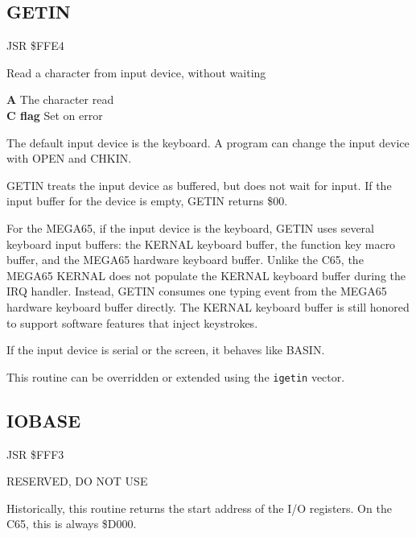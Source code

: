 \subsection{GETIN}
\label{KERNAL Jump Table!GETIN}
\begin{description}[leftmargin=2cm,style=nextline]
    \item [Address:] JSR \$FFE4
    \item [Description:] Read a character from input device, without waiting
    \item [Outputs:]
        \textbf{A} The character read \\
        \textbf{C flag} Set on error
    \item [Remarks:]
        The default input device is the keyboard. A program can change the input device with OPEN and CHKIN.

        GETIN treats the input device as buffered, but does not wait for input. If the input buffer for the device is empty, GETIN returns \$00.

        For the MEGA65, if the input device is the keyboard, GETIN uses several keyboard input buffers: the KERNAL keyboard buffer, the function key macro buffer, and the MEGA65 hardware keyboard buffer. Unlike the C65, the MEGA65 KERNAL does not populate the KERNAL keyboard buffer during the IRQ handler. Instead, GETIN consumes one typing event from the MEGA65 hardware keyboard buffer directly. The KERNAL keyboard buffer is still honored to support software features that inject keystrokes.

        If the input device is serial or the screen, it behaves like BASIN.

        This routine can be overridden or extended using the \texttt{igetin} vector.
    \item [Example:]

\end{description}



\newpage
\subsection{IOBASE}
\label{KERNAL Jump Table!IOBASE}
\begin{description}[leftmargin=2cm,style=nextline]
    \item [Address:] JSR \$FFF3
    \item [Description:] RESERVED, DO NOT USE
    \item [Remarks:]
        Historically, this routine returns the start address of the I/O registers. On the C65, this is always \$D000.
\end{description}


